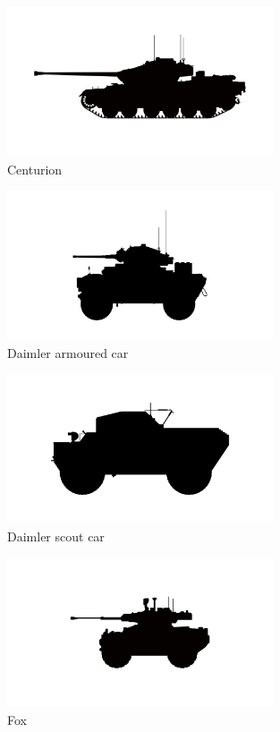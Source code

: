 \begin{figure}[h]
  \centering
  \includegraphics[width=0.7\textwidth]{platforms/centurion.pdf}
  \caption*{Centurion}
\end{figure}

\begin{figure}[h]
  \centering
  \includegraphics[width=0.7\textwidth]{platforms/daimler-armoured-car.pdf}
  \caption*{Daimler armoured car}
\end{figure}

\begin{figure}[h]
  \centering
  \includegraphics[width=0.7\textwidth]{platforms/daimler-scout.pdf}
  \caption*{Daimler scout car}
\end{figure}

\begin{figure}[h]
  \centering
  \includegraphics[width=0.7\textwidth]{platforms/fox.pdf}
  \caption*{Fox}
\end{figure}

